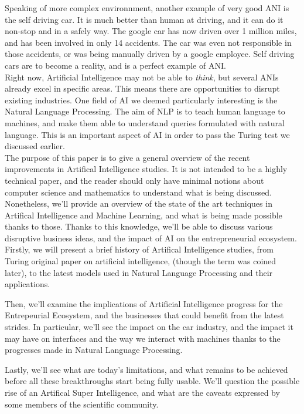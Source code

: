 \documentclass[12pt]{article}
\begin{document}
Speaking of more complex environnment, another example of very good \gls{ANI} is
the self driving car. It is much better than human at driving, and it can do it
non-stop and in a safely way. The google car has now driven over 1 million
miles, and has been involved in only 14 accidents. The car was even not
responsible in those accidents, or was being manually driven by a google
employee. Self driving cars are to become a reality, and is a perfect example of
\gls{ANI}. \\

Right now, Artificial Intelligence may not be able to {\em think}, but several
ANIs already excel in specific areas. This means there are opportunities to
disrupt existing industries. One field of AI we deemed particularly interesting
is the Natural Language Processing. The aim of NLP is to teach human language to
machines, and make them able to understand queries formulated with natural
language. This is an important aspect of AI in order to pass the Turing test we
discussed earlier. \\

The purpose of this paper is to give a general overview of the recent
improvements in Artifical Intelligence studies. It is not intended to be a
highly technical paper, and the reader should only have minimal notions about
computer science and mathematics to understand what is being discussed.
Nonetheless, we'll provide an overview of the state of the art techniques in
Artifical Intelligence and Machine Learning, and what is being made possible
thanks to those. Thanks to this knowledge, we'll be able to discuss various
disruptive business ideas, and the impact of AI on the entrepreneurial
ecosystem. \\

Firstly, we will present a brief history of Artifical Intelligence studies, from
Turing original paper on artificial intelligence, (though the term was coined
later), to the latest models used in Natural Language Processing and their
applications.

\noindent Then, we'll examine the implications of Artificial Intelligence
progress for the Entrepeurial Ecosystem, and the businesses that could benefit
from the latest strides. In particular, we'll see the impact on the car
industry, and the impact it may have on interfaces and the way we interact with
machines thanks to the progresses made in Natural Language Processing.

\noindent Lastly, we'll see what are today's limitations, and what remains to be
achieved before all these breakthroughs start being fully usable. We'll question
the possible rise of an Artifical Super Intelligence, and what are the caveats
expressed by some members of the scientific community.
\end{document}
